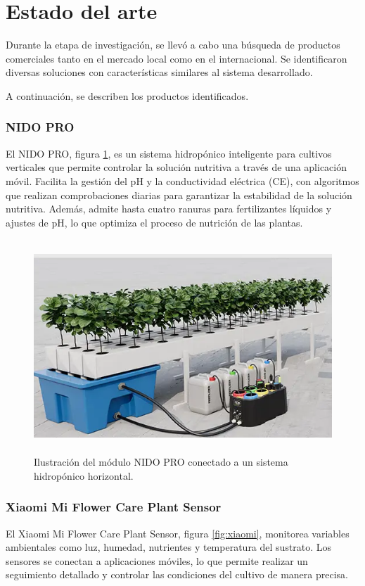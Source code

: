 \section{Estado del arte}
Durante la etapa de investigación, se llevó a cabo una búsqueda de productos comerciales tanto en el mercado local como en el internacional. Se identificaron diversas soluciones con características similares al sistema desarrollado.

A continuación, se describen los productos identificados.

\subsubsection{NIDO PRO}
El NIDO PRO, figura \ref{fig:nido_pro}, es un sistema hidropónico inteligente para cultivos verticales que permite controlar la solución nutritiva a través de una aplicación móvil. Facilita la gestión del pH y la conductividad eléctrica (CE), con algoritmos que realizan comprobaciones diarias para garantizar la estabilidad de la solución nutritiva. Además, admite hasta cuatro ranuras para fertilizantes líquidos y ajustes de pH, lo que optimiza el proceso de nutrición de las plantas.

\begin{figure}[h]
	\centering
	\includegraphics[height=8cm]{./Figures/nido:pro.png}
	\caption{Ilustración del módulo NIDO PRO conectado a un sistema hidropónico horizontal.}
	\label{fig:nido_pro}
\end{figure}


\subsubsection{Xiaomi Mi Flower Care Plant Sensor}
El Xiaomi Mi Flower Care Plant Sensor, figura \ref{fig:xiaomi}, monitorea variables ambientales como luz, humedad, nutrientes y temperatura del sustrato. Los sensores se conectan a aplicaciones móviles, lo que permite realizar un seguimiento detallado y controlar las condiciones del cultivo de manera precisa.

